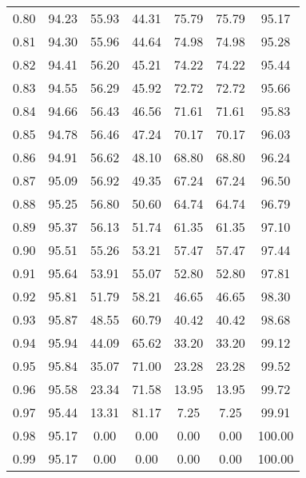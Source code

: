 \begin{tabular}{|c|c|c|c|c|c|c|}
      0.80 &     94.23 &     55.93 &      44.31 &   75.79 &      75.79 &         95.17 \\
      0.81 &     94.30 &     55.96 &      44.64 &   74.98 &      74.98 &         95.28 \\
      0.82 &     94.41 &     56.20 &      45.21 &   74.22 &      74.22 &         95.44 \\
      0.83 &     94.55 &     56.29 &      45.92 &   72.72 &      72.72 &         95.66 \\
      0.84 &     94.66 &     56.43 &      46.56 &   71.61 &      71.61 &         95.83 \\
      0.85 &     94.78 &     56.46 &      47.24 &   70.17 &      70.17 &         96.03 \\
      0.86 &     94.91 &     56.62 &      48.10 &   68.80 &      68.80 &         96.24 \\
      0.87 &     95.09 &     56.92 &      49.35 &   67.24 &      67.24 &         96.50 \\
      0.88 &     95.25 &     56.80 &      50.60 &   64.74 &      64.74 &         96.79 \\
      0.89 &     95.37 &     56.13 &      51.74 &   61.35 &      61.35 &         97.10 \\
      0.90 &     95.51 &     55.26 &      53.21 &   57.47 &      57.47 &         97.44 \\
      0.91 &     95.64 &     53.91 &      55.07 &   52.80 &      52.80 &         97.81 \\
      0.92 &     95.81 &     51.79 &      58.21 &   46.65 &      46.65 &         98.30 \\
      0.93 &     95.87 &     48.55 &      60.79 &   40.42 &      40.42 &         98.68 \\
      0.94 &     95.94 &     44.09 &      65.62 &   33.20 &      33.20 &         99.12 \\
      0.95 &     95.84 &     35.07 &      71.00 &   23.28 &      23.28 &         99.52 \\
      0.96 &     95.58 &     23.34 &      71.58 &   13.95 &      13.95 &         99.72 \\
      0.97 &     95.44 &     13.31 &      81.17 &    7.25 &       7.25 &         99.91 \\
      0.98 &     95.17 &      0.00 &       0.00 &    0.00 &       0.00 &        100.00 \\
      0.99 &     95.17 &      0.00 &       0.00 &    0.00 &       0.00 &        100.00 \\
\bottomrule
\end{tabular}
